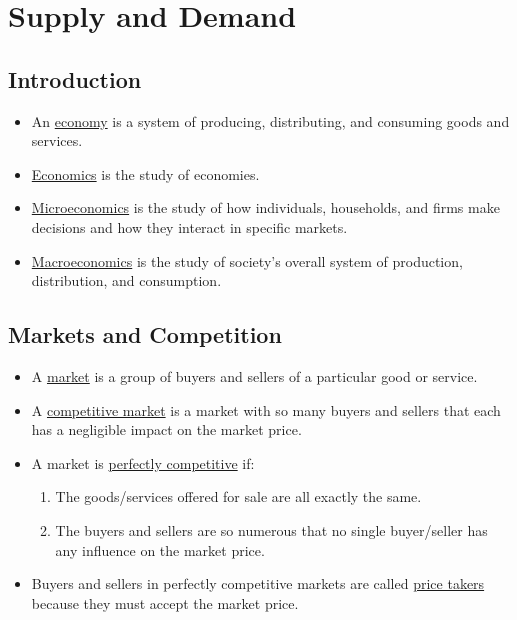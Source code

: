 \chapter{Supply and Demand}

\section{Introduction}

\begin{itemize}

	\item An \underline{economy} is a system of producing, distributing, and consuming goods and services.
	
	\item \underline{Economics} is the study of economies.

	\item \underline{Microeconomics} is the study of how individuals, households, and firms make decisions and how they interact in specific markets.

	\item \underline{Macroeconomics} is the study of society's overall system of production, distribution, and consumption.
	
\end{itemize}

\section{Markets and Competition}

	\begin{itemize}

	\item A \underline{market} is a group of buyers and sellers of a particular good or service.
	
	\item A \underline{competitive market} is a market with so many buyers and sellers that each has a negligible impact on the market price.
	
	\item A market is \underline{perfectly competitive} if:
	
		\begin{enumerate}
	
		\item The goods/services offered for sale are all exactly the same.
		
		\item The buyers and sellers are so numerous that no single buyer/seller has any influence on the market price.
	
		\end{enumerate}
	
	\item Buyers and sellers in perfectly competitive markets are called \underline{price takers} because they must accept the market price. 

	\end{itemize}

